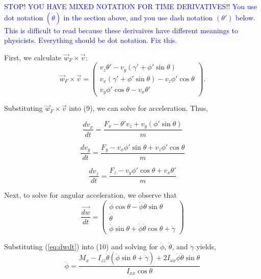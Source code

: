 \documentclass[a4paper,12pt, oneside]{article}
\newcommand{\blue}[1]{\textcolor{blue}{#1}}
\begin{document}
\blue{STOP! YOU HAVE MIXED NOTATION FOR TIME DERIVATIVES!! You use dot notation $(\dot{\theta})$ in the section above, and you use dash notation $(\theta')$ below. This is difficult to read because these derivaives have different meanings to physicists. Everything should be dot notation. Fix this.}

First, we calculate $\vec{w}_F\times\vec{v}$: 
\begin{equation*}
\vec{w}_F\times\vec{v}=\left(\begin{array}{ccc} v_z\theta'-v_y(\gamma'+\phi'\sin\theta) \\ v_x(\gamma'+\phi'\sin\theta)-v_z\phi'\cos\theta \\ v_y\phi'\cos\theta-v_x\theta'\end{array}\right).
\end{equation*}

Substituting $\vec{w}_F\times\vec{v}$ into (9), we can solve for acceleration. Thus,

\begin{equation}
\frac{{dv}_x}{dt}=\frac{{F}_x-\theta'v_z+v_y(\phi'\sin\theta)}{m}
\end{equation}

\begin{equation}
\frac{{dv}_y}{dt}=\frac{F_y-v_x\phi'\sin\theta+v_z\phi'\cos\theta}{m}
\end{equation}

\begin{equation}
\frac{{dv}_z}{dt}=\frac{F_z-v_y\phi'\cos\theta+v_x\theta'}{m}
\end{equation}

Next, to solve for angular acceleration, we observe that 
\begin{equation}
  \label{eq:dwdt}
\frac{\vec{dw}}{dt}=\left(\begin{array}{ccc}\ddot\phi\cos\theta-\dot\phi\dot\theta\sin\theta\\ \ddot\theta \\ \ddot\phi\sin\theta + \dot\phi\dot\theta\cos\theta+\ddot\gamma\end{array} \right)
\end{equation}

Substituting (\ref{eq:dwdt}) into (10) and solving for $\ddot\phi$, $\ddot\theta$, and $\ddot\gamma$ yields,
\begin{equation}
\ddot\phi=\frac{M_x-I_{zz}\dot\theta(\dot\phi\sin\theta+\dot\gamma)+2I_{xx}\dot\phi\dot\theta\sin\theta}{I_{xx}\cos\theta}
\end{equation}
\end{document}
